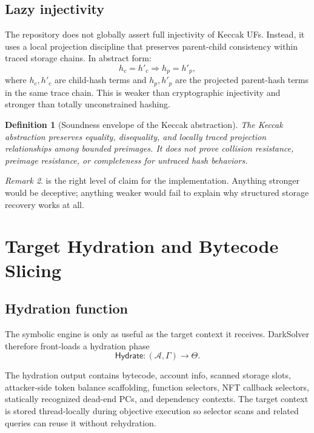 \documentclass[11pt]{article}
\numberwithin{equation}{section}
\newtheorem{definition}{Definition}[section]
\theoremstyle{remark}
\newtheorem{remark}[definition]{Remark}
\newcommand{\Ctx}{\Theta}
\newcommand{\Hydrate}{\mathsf{Hydrate}}
\newcommand{\Addr}{\mathcal{A}}
\begin{document}
\subsection{Lazy injectivity}

The repository does not globally assert full injectivity of Keccak UFs. Instead, it uses a local projection discipline that preserves parent-child consistency within traced storage chains. In abstract form:
\begin{equation}
\label{eq:lazy-injectivity}
h_c = h'_c \Longrightarrow h_p = h'_p,
\end{equation}
where \(h_c,h'_c\) are child-hash terms and \(h_p,h'_p\) are the projected parent-hash terms in the same trace chain. This is weaker than cryptographic injectivity and stronger than totally unconstrained hashing.

\begin{definition}[Soundness envelope of the Keccak abstraction]
\label{def:keccak-envelope}
The Keccak abstraction preserves equality, disequality, and locally traced projection relationships among bounded preimages. It does not prove collision resistance, preimage resistance, or completeness for untraced hash behaviors.
\end{definition}

\begin{remark}
 is the right level of claim for the implementation. Anything stronger would be deceptive; anything weaker would fail to explain why structured storage recovery works at all.
\end{remark}

\section{Target Hydration and Bytecode Slicing}
\label{sec:hydration}

\subsection{Hydration function}

The symbolic engine is only as useful as the target context it receives. DarkSolver therefore front-loads a hydration phase
\begin{equation}
\label{eq:hydrate}
\Hydrate : (\Addr,\Gamma) \to \Ctx.
\end{equation}

The hydration output contains bytecode, account info, scanned storage slots, attacker-side token balance scaffolding, function selectors, NFT callback selectors, statically recognized dead-end PCs, and dependency contexts. The target context is stored thread-locally during objective execution so selector scans and related queries can reuse it without rehydration.
\end{document}
